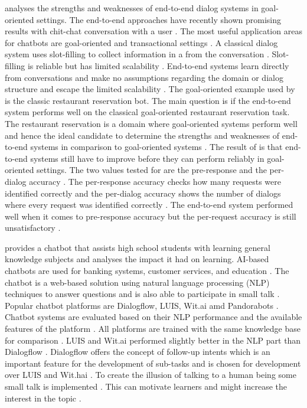 \citet{bordes2016learning} analyses the strengths and weaknesses of end-to-end dialog systems in goal-oriented settings.
The end-to-end approaches have recently shown promising results with chit-chat conversation with a user \cite{bordes2016learning}.
The most useful application areas for chatbots are goal-oriented and transactional settings \cite{bordes2016learning}.
A classical dialog system uses slot-filling to collect information in a from the conversation \cite{bordes2016learning}.
Slot-filling is reliable but has limited scalability \cite{bordes2016learning}.
End-to-end systems learn directly from conversations and make no assumptions regarding the domain or dialog structure and escape the limited scalability \cite{bordes2016learning}. 
The goal-oriented example used by \citet{bordes2016learning} is the classic restaurant reservation bot.
The main question is if the end-to-end system performs well on the classical goal-oriented restaurant reservation task.
The restaurant reservation is a domain where goal-oriented systems perform well and hence the ideal candidate to determine the strengths and weaknesses of end-to-end systems in comparison to goal-oriented systems \cite{bordes2016learning}.
The result of \citet{bordes2016learning} is that end-to-end systems still have to improve before they can perform reliably in goal-oriented settings. The two values tested for are the pre-response and the per-dialog accuracy \cite{bordes2016learning}.
The per-response accuracy checks how many requests were identified correctly and the per-dialog accuracy shows the number of dialogs where every request was identified correctly \cite{bordes2016learning}. The end-to-end system performed well when it comes to pre-response accuracy but the per-request accuracy is still unsatisfactory \cite{bordes2016learning}.

\citet{dutta2017developing} provides a chatbot that assists high school students with learning general knowledge subjects and analyses the impact it had on learning.
AI-based chatbots are used for banking systems, customer services, and education \cite{dutta2017developing}.
The chatbot is a web-based solution using natural language processing (NLP) techniques to answer questions and is also able to participate in small talk \cite{dutta2017developing}.
Popular chatbot platforms are Dialogflow, LUIS, Wit.ai amd Pandorabots \cite{dutta2017developing}.
Chatbot systems are evaluated based on their NLP performance and the available features of the platform \cite{dutta2017developing}. All platforms are trained with the same knowledge base for comparison \cite{dutta2017developing}. LUIS and Wit.ai performed slightly better in the NLP part than Dialogflow \cite{dutta2017developing}.
Dialogflow offers the concept of follow-up intents which is an important feature for the development of sub-tasks and is chosen for development over LUIS and Wit.hai \cite{dutta2017developing}.
To create the illusion of talking to a human being some small talk is implemented \cite{dutta2017developing}. This can motivate learners and might increase the interest in the topic \cite{dutta2017developing}.

